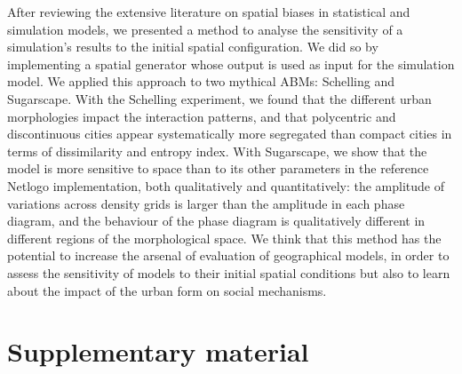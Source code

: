 \documentclass[3p,times,procedia]{elsarticle}
\begin{document}
After reviewing the extensive literature on spatial biases in statistical and simulation models, we presented a method to analyse the sensitivity of a simulation's results to the initial spatial configuration. We did so by implementing a spatial generator whose output is used as input for the simulation model. We applied this approach to two mythical ABMs: Schelling and Sugarscape. With the Schelling experiment, we found that the different urban morphologies impact the  interaction patterns, and that polycentric and discontinuous cities appear systematically more segregated than compact cities in terms of dissimilarity and entropy index. With Sugarscape, we show that the model is more sensitive to space than to its other parameters in the reference Netlogo implementation, both qualitatively and quantitatively: the amplitude of variations across density grids is larger than the amplitude in each phase diagram, and the behaviour of the phase diagram is qualitatively different in different regions of the morphological space. We think that this method has the potential to increase the arsenal of evaluation of geographical models, in order to assess the sensitivity of models to their initial spatial conditions but also to learn about the impact of the urban form on social mechanisms.









\newpage

\section*{Supplementary material}
\end{document}
